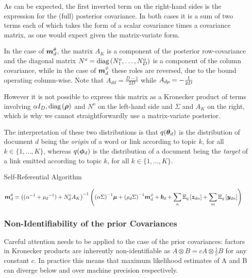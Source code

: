 As can be expected, the first inverted term on the right-hand sides is the expression for the (full) posterior covariance. In both cases it is a sum of two terms each of which takes the form of a scalar covariance times a covariance matrix, as one would expect given the matrix-variate form. 

In the case of $\mtd$, the matrix $A_K$ is a component of the posterior row-covariance and the diagonal matrix $N^o = \diag{N^o_1, \ldots, N^o_D}$ is a component of the column covariance, while in the case of $\mpd$ these roles are reversed, due to the bound operating column-wise. Note that $A_{dd} = \frac{D-1}{2D}$ while $A_{dp} = - \oneover{2D}$

However it is not possible to express this matrix as a Kronecker product of terms involving $\alpha I_D, \diag{\vv{\rho}}$ and $N^o$ on the left-hand side and $\Sigma$ and $A_K$ on the right, which is why we cannot straightforwardly use a matrix-variate posterior.

The interpretation of these two distributions is that $q(\thd)$ is the distribution of document $d$ being the \emph{origin} of a word or link according to topic $k$, for all $k \in \{1, \ldots, K\}$, whereas $q(\vv{\phi}_d)$ is the distribution of a document being the \emph{target} of a link emitted according to topic $k$, for all $k \in \{1, \ldots, K\}$.

\begin{algorithm}
\caption{Self-Referential Algorithm}
\label{alg:sra_generic}
    \begin{align*}
        \mtd &= 
            \invb{ (\inv{\alpha} + \inv{\rho_d}) + N^o_d A_K }
            \left(
                \invb{\alpha \Sigma}\vv{\mu}
                + \invb{\rho_d \Sigma} \mpd + \vv{b}_d 
                + \sum_n \ex{\vv{z}_{dn}}{q} 
                + \sum_m \ex{\vv{y}_{dn}}{q}
            \right)
    \end{align*}
\end{algorithm}

\subsubsection*{Non-Identifiability of the prior Covariances}
Careful attention needs to be applied to the case of the prior covariances: factors in Kronecker products are inherently non-identifiable as $A \otimes B = c A \otimes \frac{1}{c} B$ for any constant $c$. In practice this means that maximum likelihood estimates of A and B can diverge below and over machine precision respectively.

